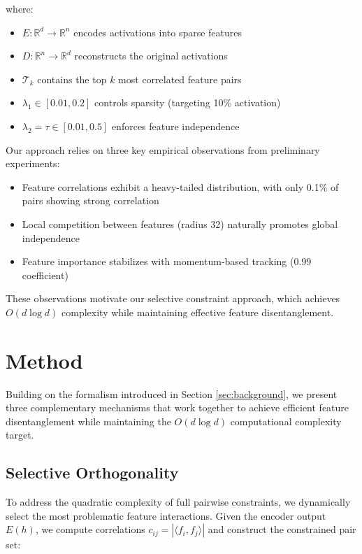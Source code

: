 \documentclass{article} %
\begin{document}
where:
\begin{itemize}
    \item $E: \mathbb{R}^d \rightarrow \mathbb{R}^n$ encodes activations into sparse features
    \item $D: \mathbb{R}^n \rightarrow \mathbb{R}^d$ reconstructs the original activations
    \item $\mathcal{T}_k$ contains the top $k$ most correlated feature pairs
    \item $\lambda_1 \in [0.01, 0.2]$ controls sparsity (targeting 10\% activation)
    \item $\lambda_2 = \tau \in [0.01, 0.5]$ enforces feature independence
\end{itemize}

Our approach relies on three key empirical observations from preliminary experiments:
\begin{itemize}
    \item Feature correlations exhibit a heavy-tailed distribution, with only 0.1\% of pairs showing strong correlation
    \item Local competition between features (radius 32) naturally promotes global independence
    \item Feature importance stabilizes with momentum-based tracking (0.99 coefficient)
\end{itemize}

These observations motivate our selective constraint approach, which achieves $O(d \log d)$ complexity while maintaining effective feature disentanglement.

\section{Method}
\label{sec:method}

Building on the formalism introduced in Section \ref{sec:background}, we present three complementary mechanisms that work together to achieve efficient feature disentanglement while maintaining the $O(d \log d)$ computational complexity target.

\subsection{Selective Orthogonality}
To address the quadratic complexity of full pairwise constraints, we dynamically select the most problematic feature interactions. Given the encoder output $E(h)$, we compute correlations $c_{ij} = |\langle f_i, f_j \rangle|$ and construct the constrained pair set:
\end{document}
